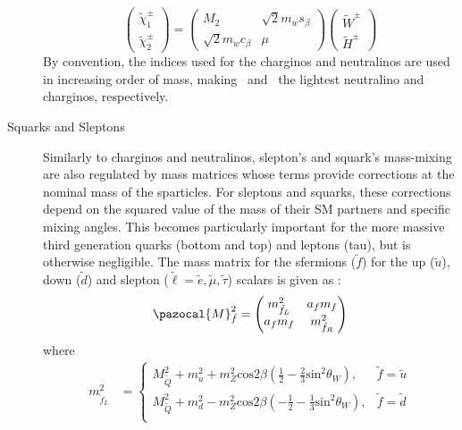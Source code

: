 \begin{description}
	\begin{equation}
	\begin{pmatrix} 
		\tilde{\chi}^{\pm}_1 \\ 
		\tilde{\chi}^{\pm}_2 
	\end{pmatrix} 
	 =
	\begin{pmatrix} 
		M_2                      & \sqrt{2}m_ws_{\beta}                     \\
		\sqrt{2}m_wc_{\beta}   & \mu                         
	\end{pmatrix}
	\begin{pmatrix} 
		\tilde{W}^{\pm} \\ 
		\tilde{H}^{\pm} 
	\end{pmatrix} 
	\end{equation}
	By convention, the indices used for the charginos and neutralinos are used in increasing order of mass, making \ninoone\ and \chinoonepm\ the lightest neutralino and charginos, respectively.
	\item[Squarks and Sleptons] Similarly to charginos and neutralinos, slepton's and squark's mass-mixing are also regulated by mass matrices whose terms provide corrections at the nominal mass of the sparticles. For sleptons and squarks, these corrections depend on the squared value of the mass of their \ac{SM} partners and specific mixing angles. This becomes particularly important for the more massive third generation quarks (bottom and top) and leptons (tau), but is otherwise negligible.  
	The mass matrix for the sfermions ($\tilde{f}$) for the up ($\tilde{u}$), down ($\tilde{d}$) and slepton ($\tilde{\ell}=\tilde{e},\tilde{\mu},\tilde{\tau}$) scalars is given as :
	\begin{equation}
	\pazocal{M}^2_{\tilde{f}}=
	\begin{pmatrix} 
		m^2_{\tilde{f}_L}  & a_f m_f\\ 
	 	a_f m_f & m^2_{\tilde{f}_R}
	\end{pmatrix} \label{eq:mass_matrix}
	\end{equation}
	where
	\begin{equation}
	\begin{split}
	m^2_{\tilde{f}_L} &= \begin{cases}
	M^2_{\tilde{Q}} + m_u^2 + m_Z^2\mathrm{cos}2\beta\left(\frac{1}{2} - \frac{2}{3} \mathrm{sin}^2\theta_W \right), & \tilde{f}=\tilde{u}\\
	M^2_{\tilde{Q}} + m_d^2 - m_Z^2\mathrm{cos}2\beta\left(-\frac{1}{2} - \frac{1}{3} \mathrm{sin}^2\theta_W \right), & \tilde{f}=\tilde{d}\\

\end{cases}
\end{split}
\end{equation}
\end{description}
